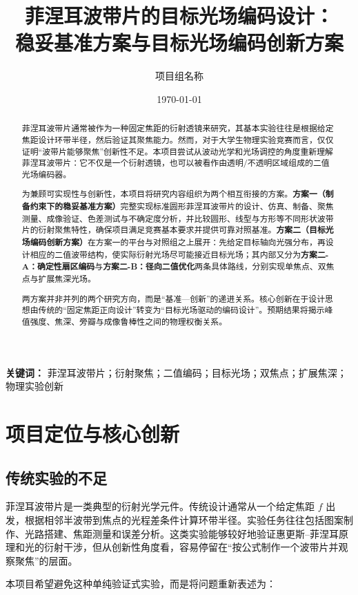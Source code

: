 \documentclass[UTF8,a4paper,11pt]{ctexart}
\title{\heiti 菲涅耳波带片的目标光场编码设计：\\稳妥基准方案与目标光场编码创新方案}
\author{项目组名称}
\date{\today}
\begin{document}
\maketitle

\begin{abstract}
菲涅耳波带片通常被作为一种固定焦距的衍射透镜来研究，其基本实验往往是根据给定焦距设计环带半径，然后验证其聚焦能力。然而，对于大学生物理实验竞赛而言，仅仅证明“波带片能够聚焦”创新性不足。本项目尝试从波动光学和光场调控的角度重新理解菲涅耳波带片：它不仅是一个衍射透镜，也可以被看作由透明/不透明区域组成的二值光场编码器。

为兼顾可实现性与创新性，本项目将研究内容组织为两个相互衔接的方案。\textbf{方案一（制备约束下的稳妥基准方案）}完整实现标准圆形菲涅耳波带片的设计、仿真、制备、聚焦测量、成像验证、色差测试与不确定度分析，并比较圆形、线型与方形等不同形状波带片的衍射聚焦特性，确保项目满足竞赛基本要求并提供可靠对照基准。\textbf{方案二（目标光场编码创新方案）}在方案一的平台与对照组之上展开：先给定目标轴向光强分布，再设计相应的二值波带结构，使实际衍射光场尽可能接近目标光场；其内部又分为\textbf{方案二-A：确定性扇区编码}与\textbf{方案二-B：径向二值优化}两条具体路线，分别实现单焦点、双焦点与扩展焦深光场。

两方案并非并列的两个研究方向，而是“基准—创新”的递进关系。核心创新在于设计思想由传统的“固定焦距正向设计”转变为“目标光场驱动的编码设计”。预期结果将揭示峰值强度、焦深、旁瓣与成像鲁棒性之间的物理权衡关系。
\end{abstract}

\noindent\textbf{关键词：} 菲涅耳波带片；衍射聚焦；二值编码；目标光场；双焦点；扩展焦深；物理实验创新

\section{项目定位与核心创新}

\subsection{传统实验的不足}

菲涅耳波带片是一类典型的衍射光学元件。传统设计通常从一个给定焦距 $f$ 出发，根据相邻半波带到焦点的光程差条件计算环带半径。实验任务往往包括图案制作、光路搭建、焦距测量和误差分析。这类实验能够较好地验证惠更斯--菲涅耳原理和光的衍射干涉，但从创新性角度看，容易停留在“按公式制作一个波带片并观察聚焦”的层面。

本项目希望避免这种单纯验证式实验，而是将问题重新表述为：
\end{document}
